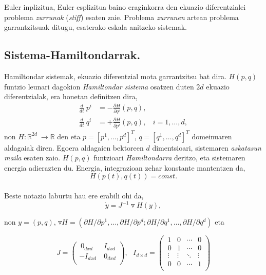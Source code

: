 Euler inplizitua, Euler esplizitua baino eraginkorra den ekuazio diferentzialei problema \emph{zurrunak} (\emph{stiff}) esaten zaie. Problema \emph{zurrunen} artean problema garrantzitsuak ditugu, esaterako eskala anitzeko sistemak. 

 

\subsection{Sistema-Hamiltondarrak.}

 
Hamiltondar sistemak, ekuazio diferentzial mota garrantzitsu bat dira. $H(p,q)$ funtzio leunari dagokion \emph{Hamiltondar sistema} osatzen duten $2d$ ekuazio diferentzialak, era honetan definitzen dira,
\begin{align*}
\label{eq:212}
\frac{d}{dt} \ {p}^i & =-\frac{\partial H }{\partial q^i} (p,q), \\
\frac{d}{dt} \ {q}^i & =+\frac{\partial H}{\partial p^i} (p,q), \ \ \ \ i=1,\dots,d,
\end{align*}
non $H: {\mathbb{R}}^{2d} \ \longrightarrow {\mathbb{R}}$  den eta  $p=[p^1, \dots , p^d]^T$, $q=[q^1, \dots , q^d]^T$ domeinuaren aldagaiak diren. Egoera aldagaien bektoreen $d$ dimentsioari, sistemaren \emph{askatasun maila} esaten zaio. $H(p,q)$ funtzioari \emph{Hamiltondarra} deritzo, eta sistemaren energia adierazten du. Energia, integrazioan zehar konstante mantentzen da,
\begin{equation*}
\label{eq:212b}
H(p(t),q(t))=const.
\end{equation*}

\paragraph*{}Beste notazio laburtu hau ere erabili ohi da,
\begin{equation*}
 \label{eq:213}
\dot{y}=J^{-1}\triangledown H(y),
\end{equation*}

non $y=(p,q)$, $\triangledown H=(\partial H/\partial p^1,\dots,\partial H/\partial p^d; \partial H/\partial q^1,\dots,\partial H/\partial q^d)$ eta

\begin{equation*}
 J=\left(\begin{array}{cc}
   \ 0_{dxd} & \ I_{dxd} \\
    -I_{dxd} & \ 0_{dxd} \\
\end{array}\right), \ \ \ 
I_{d \times d}=\left(\begin{array}{cccc}
   \ 1       & 0      & \cdots & 0 \\
   \ 0       & 1      & \cdots & 0 \\
   \ \vdots  & \vdots & \ddots & \vdots \\
   \ 0       & 0 & \cdots & 1 \\
\end{array}\right)  
\end{equation*}


